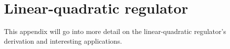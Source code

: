 
\chapter{Linear-quadratic regulator}
\label{ch:deriv_lqr}

This appendix will go into more detail on the linear-quadratic regulator's
derivation and interesting applications.

\renewcommand*{\chapterpath}{\partpath/linear-quadratic-regulator}



